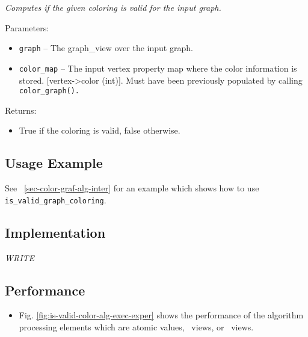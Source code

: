 \textit{
Computes if the given coloring is valid for the input graph.
}
\vspace{0.4cm}

Parameters:
\begin{itemize}
\item
\texttt{graph} --
The graph\_view over the input graph.
\item
\texttt{color\_map} --
The input vertex property map where the color information is stored. [vertex->color (int)]. Must have been previously populated by calling 
\texttt{color\_graph().}
\end{itemize}

Returns:
\begin{itemize}
\item
True if the coloring is valid, false otherwise. 
\end{itemize}

\subsection{Usage Example} \label{sec-is-valid-color-alg-use}

See ~\ref{sec-color-graf-alg-inter}
for an example which shows how to use 
\texttt{is\_valid\_graph\_coloring}.


\subsection{Implementation} \label{sec-is-valid-color-alg-impl}

\textit{WRITE}

\subsection{Performance} \label{sec-is-valid-color-alg-perf}

\begin{itemize}
\item
Fig. \ref{fig:is-valid-color-alg-exec-exper}
shows the performance of the algorithm processing
elements which are atomic values, \stl\ views, or \stapl\ views.
\end{itemize}

